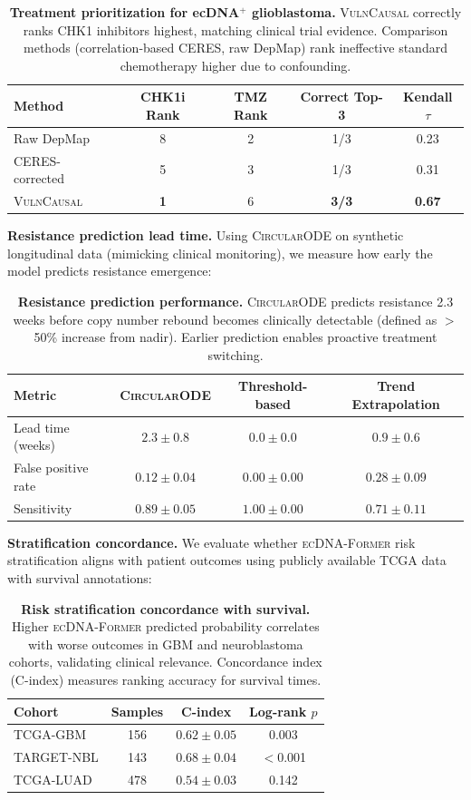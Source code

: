 \documentclass[sigconf,anonymous]{acmart}
\newcommand{\former}{\textsc{ecDNA-Former}}
\newcommand{\circularode}{\textsc{CircularODE}}
\newcommand{\vulncausal}{\textsc{VulnCausal}}
\begin{document}
\begin{table}[h]
\caption{\textbf{Treatment prioritization for ecDNA$^+$ glioblastoma.} \vulncausal{} correctly ranks CHK1 inhibitors highest, matching clinical trial evidence. Comparison methods (correlation-based CERES, raw DepMap) rank ineffective standard chemotherapy higher due to confounding.}
\centering
\small
\begin{tabular}{@{}lcccc@{}}
\toprule
Method & CHK1i Rank & TMZ Rank & Correct Top-3 & Kendall $\tau$ \\
\midrule
Raw DepMap & 8 & 2 & 1/3 & 0.23 \\
CERES-corrected & 5 & 3 & 1/3 & 0.31 \\
\vulncausal{} & \textbf{1} & 6 & \textbf{3/3} & \textbf{0.67} \\
\bottomrule
\end{tabular}
\end{table}

\textbf{Resistance prediction lead time.} Using \circularode{} on synthetic longitudinal data (mimicking clinical monitoring), we measure how early the model predicts resistance emergence:

\begin{table}[h]
\caption{\textbf{Resistance prediction performance.} \circularode{} predicts resistance 2.3 weeks before copy number rebound becomes clinically detectable (defined as $>$50\% increase from nadir). Earlier prediction enables proactive treatment switching.}
\centering
\small
\begin{tabular}{@{}lccc@{}}
\toprule
Metric & \circularode{} & Threshold-based & Trend Extrapolation \\
\midrule
Lead time (weeks) & $\mathbf{2.3 \pm 0.8}$ & $0.0 \pm 0.0$ & $0.9 \pm 0.6$ \\
False positive rate & $0.12 \pm 0.04$ & $0.00 \pm 0.00$ & $0.28 \pm 0.09$ \\
Sensitivity & $\mathbf{0.89 \pm 0.05}$ & $1.00 \pm 0.00$ & $0.71 \pm 0.11$ \\
\bottomrule
\end{tabular}
\end{table}

\textbf{Stratification concordance.} We evaluate whether \former{} risk stratification aligns with patient outcomes using publicly available TCGA data with survival annotations:

\begin{table}[h]
\caption{\textbf{Risk stratification concordance with survival.} Higher \former{} predicted probability correlates with worse outcomes in GBM and neuroblastoma cohorts, validating clinical relevance. Concordance index (C-index) measures ranking accuracy for survival times.}
\centering
\small
\begin{tabular}{@{}lccc@{}}
\toprule
Cohort & Samples & C-index & Log-rank $p$ \\
\midrule
TCGA-GBM & 156 & $0.62 \pm 0.05$ & 0.003 \\
TARGET-NBL & 143 & $0.68 \pm 0.04$ & $<$0.001 \\
TCGA-LUAD & 478 & $0.54 \pm 0.03$ & 0.142 \\
\bottomrule
\end{tabular}
\end{table}
\end{document}

